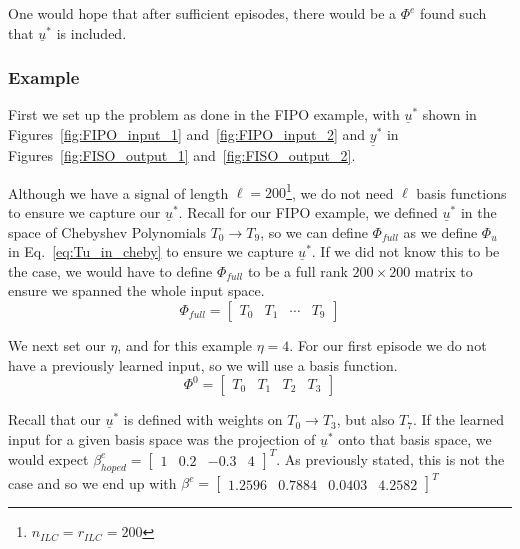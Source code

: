 One would hope that after sufficient episodes, there would be a $\Phi^e$ found such that $\underline{u}^\ast$ is included.

\FloatBarrier\subsubsection{Example}
First we set up the problem as done in the FIPO example, with $\underline{u}^\ast$ shown in Figures~\ref{fig:FIPO_input_1} and~\ref{fig:FIPO_input_2} and $\underline{y}^\ast$ in Figures~\ref{fig:FISO_output_1} and~\ref{fig:FISO_output_2}.

Although we have a signal of length $\ell = 200$\footnote{$n_{ILC} = r_{ILC} = 200$}, we do not need $\ell$ basis functions to ensure we capture our $\underline{u}^\ast$. Recall for our FIPO example, we defined $\underline{u}^\ast$ in the space of Chebyshev Polynomials $T_0 \to T_9$, so we can define $\Phi_{full}$ as we define $\Phi_u$ in Eq.~\ref{eq:Tu_in_cheby} to ensure we capture $\underline{u}^\ast$. If we did not know this to be the case, we would have to define $\Phi_{full}$ to be a full rank $200 \times 200$ matrix to ensure we spanned the whole input space.
\begin{equation}
    \Phi_{full} =
    \begin{bmatrix}
        T_0 & T_1 & \cdots & T_9
    \end{bmatrix}
\end{equation}

We next set our $\eta$, and for this example $\eta = 4$. For our first episode we do not have a previously learned input, so we will use a basis function. 
\begin{equation}
    \Phi^0 =
    \begin{bmatrix}
        T_0 & T_1 & T_2 & T_3
    \end{bmatrix}
\end{equation}

Recall that our $\underline{u}^\ast$ is defined with weights on $T_0 \to T_3$, but also $T_7$. If the learned input for a given basis space was the projection of $\underline{u}^\ast$ onto that basis space, we would expect $\beta_{hoped}^e = {\begin{bmatrix}1 & 0.2 & -0.3 & 4\end{bmatrix}}^T$. As previously stated, this is not the case and so we end up with $\beta^e = {\begin{bmatrix}1.2596  &  0.7884  &  0.0403  &  4.2582\end{bmatrix}}^T$

